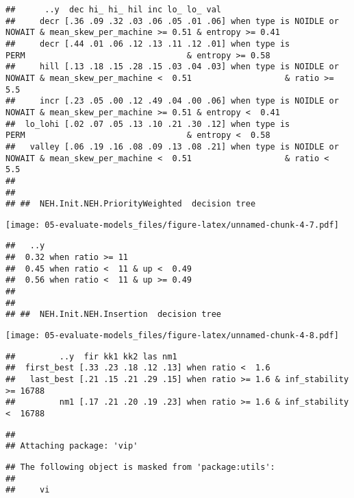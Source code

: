\documentclass[
]{article}
\begin{document}
\begin{verbatim}
##      ..y  dec hi_ hi_ hil inc lo_ lo_ val                                                                                                
##     decr [.36 .09 .32 .03 .06 .05 .01 .06] when type is NOIDLE or NOWAIT & mean_skew_per_machine >= 0.51 & entropy >= 0.41               
##     decr [.44 .01 .06 .12 .13 .11 .12 .01] when type is             PERM                                 & entropy >= 0.58               
##     hill [.13 .18 .15 .28 .15 .03 .04 .03] when type is NOIDLE or NOWAIT & mean_skew_per_machine <  0.51                   & ratio >= 5.5
##     incr [.23 .05 .00 .12 .49 .04 .00 .06] when type is NOIDLE or NOWAIT & mean_skew_per_machine >= 0.51 & entropy <  0.41               
##  lo_lohi [.02 .07 .05 .13 .10 .21 .30 .12] when type is             PERM                                 & entropy <  0.58               
##   valley [.06 .19 .16 .08 .09 .13 .08 .21] when type is NOIDLE or NOWAIT & mean_skew_per_machine <  0.51                   & ratio <  5.5
## 
## 
## ##  NEH.Init.NEH.PriorityWeighted  decision tree
\end{verbatim}

\texttt{[image: 05-evaluate-models\_files/figure-latex/unnamed-chunk-4-7.pdf]}

\begin{verbatim}
##   ..y                              
##  0.32 when ratio >= 11             
##  0.45 when ratio <  11 & up <  0.49
##  0.56 when ratio <  11 & up >= 0.49
## 
## 
## ##  NEH.Init.NEH.Insertion  decision tree
\end{verbatim}

\texttt{[image: 05-evaluate-models\_files/figure-latex/unnamed-chunk-4-8.pdf]}

\begin{verbatim}
##         ..y  fir kk1 kk2 las nm1                                            
##  first_best [.33 .23 .18 .12 .13] when ratio <  1.6                         
##   last_best [.21 .15 .21 .29 .15] when ratio >= 1.6 & inf_stability >= 16788
##         nm1 [.17 .21 .20 .19 .23] when ratio >= 1.6 & inf_stability <  16788
\end{verbatim}

\begin{verbatim}
## 
## Attaching package: 'vip'
\end{verbatim}

\begin{verbatim}
## The following object is masked from 'package:utils':
## 
##     vi
\end{verbatim}
\end{document}
